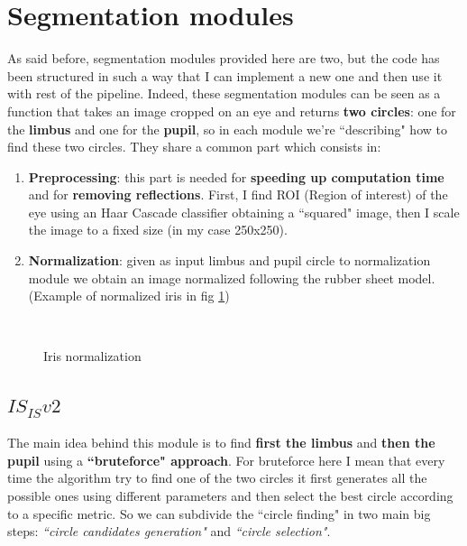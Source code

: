 \documentclass{article}
\begin{document}
\section{Segmentation modules}
As said before, segmentation modules provided here are two, but the code has been structured in such a way that I can implement a new one and then use it with rest of the pipeline. Indeed, these segmentation modules can be seen as a function that takes an image cropped on an eye and returns \textbf{two circles}: one for the \textbf{limbus} and one for the \textbf{pupil}, so in each module we're ``describing" how to find these two circles.
They share a common part which consists in:
\begin{enumerate}
    \item \textbf{Preprocessing}: this part is needed for \textbf{speeding up computation time} and for \textbf{removing reflections}. First, I find ROI (Region of interest) of the eye using an Haar Cascade classifier obtaining a ``squared" image, then I scale the image to a fixed size (in my case 250x250).
    \item \textbf{Normalization}: given as input limbus and pupil circle to normalization module we obtain an image normalized following the rubber sheet model. (Example of normalized iris in fig \ref{fig:rsm})
\end{enumerate}

\begin{figure}[H]
    \centering
    \\
    \caption{Iris normalization}
    \label{fig:rsm}
\end{figure}

\subsection{$IS_{IS} v2$}
The main idea behind this module is to find \textbf{first the limbus} and \textbf{then the pupil} using a \textbf{``bruteforce" approach}. For bruteforce here I mean that every time the algorithm try to find one of the two circles it first generates all the possible ones using different parameters and then select the best circle according to a specific metric. So we can subdivide the ``circle finding" in two main big steps: \textit{``circle candidates generation"} and \textit{``circle selection"}.
\end{document}
